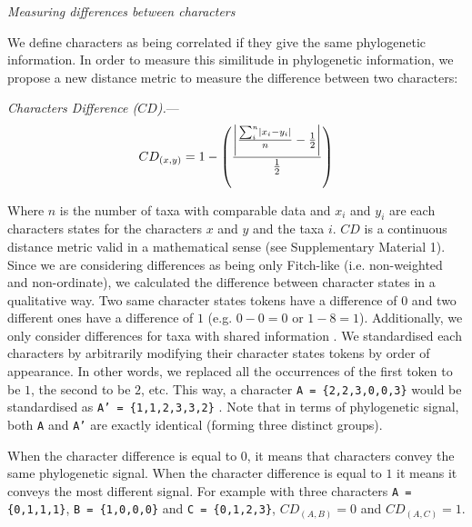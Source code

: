\documentclass[12pt,letterpaper]{article}
\DeclarePairedDelimiter\abs{\lvert}{\rvert}%
\renewcommand{\subsection}[1]{%
\bigskip
\begin{center}
\begin{large}
\normalfont\itshape #1
\end{large}
\end{center}}
\renewcommand{\subsubsection}[1]{%
\vspace{2ex}
\noindent
\textit{#1.}---}
\begin{document}
\subsection{Measuring differences between characters}
\label{CD_description}
We define characters as being correlated if they give the same phylogenetic information.
In order to measure this similitude in phylogenetic information, we propose a new distance metric to measure the difference between two characters:

\subsubsection{Characters Difference ($CD$)}
\begin{equation}
    CD_{(x,y)} = 1 - \left(\frac{\abs*{\frac{\sum_{i}^{n}\abs{x_{i} - y_{i}}}{n}-\frac{1}{2}}}{\frac{1}{2}}\right)
\end{equation}

\noindent Where $n$ is the number of taxa with comparable data and $x_i$ and $y_i$ are each characters states for the characters $x$ and $y$ and the taxa $i$.
$CD$ is a continuous distance metric valid in a mathematical sense (see Supplementary Material 1).
Since we are considering differences as being only Fitch-like (i.e. non-weighted and non-ordinate), we calculated the difference between character states in a qualitative way.
Two same character states tokens have a difference of $0$ and two different ones have a difference of $1$ (e.g. $0 - 0 = 0$ or $1 - 8 = 1$).
Additionally, we only consider differences for taxa with shared information \citep[i.e. a Gower distance;][]{GowerDist}.
We standardised each characters by arbitrarily modifying their character states tokens by order of appearance.
In other words, we replaced all the occurrences of the first token to be $1$, the second to be $2$, etc.
This way, a character \texttt{A = \{2,2,3,0,0,3\}} would be standardised as \texttt{A' = \{1,1,2,3,3,2\}} \citep[following the \textit{xyz} notation in][p.13]{felsenstein2004inferring}.
Note that in terms of phylogenetic signal, both \texttt{A} and \texttt{A'} are exactly identical (forming three distinct groups).

When the character difference is equal to $0$, it means that characters convey the same phylogenetic signal.
When the character difference is equal to $1$ it means it conveys the most different signal.
For example with three characters \texttt{A = \{0,1,1,1\}}, \texttt{B = \{1,0,0,0\}} and \texttt{C = \{0,1,2,3\}}, $CD_{(A,B)} = 0$ and $CD_{(A,C)} = 1$.
\end{document}

